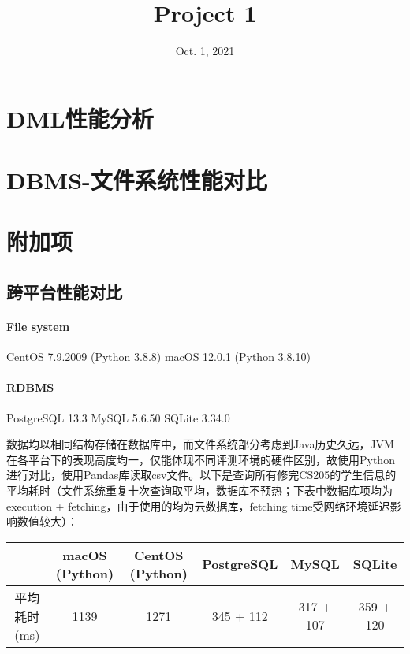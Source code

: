 \documentclass[onecolumn, oneside, ctexart]{SUSTechHomework}
\title{Project 1}
\date{Oct. 1, 2021}
\begin{document}
  \maketitle
  \tableofcontents
  \pagebreak
  \setcounter{page}{1}



\section{DML性能分析}





\section{DBMS-文件系统性能对比}



\section{附加项}





\subsection{跨平台性能对比}
\paragraph{File system}  CentOS 7.9.2009 (Python 3.8.8)\qquad{} macOS 12.0.1 (Python 3.8.10)
\vspace{-1.4em}
\paragraph{RDBMS} \quad\hspace{.276em} PostgreSQL 13.3\qquad{} MySQL 5.6.50\qquad{} SQLite 3.34.0
\par 数据均以相同结构存储在数据库中，而文件系统部分考虑到Java历史久远，JVM在各平台下的表现高度均一，仅能体现不同评测环境的硬件区别，故使用Python进行对比，使用Pandas库读取csv文件。以下是查询所有修完CS205的学生信息的平均耗时（文件系统重复十次查询取平均，数据库不预热；下表中数据库项均为execution + fetching，由于使用的均为云数据库，fetching time受网络环境延迟影响数值较大）：
\begin{table}[!h]
\centering
\begin{tabular}{|c|c|c|c|c|c|}
\hline
          & macOS (Python) & CentOS (Python) & PostgreSQL & MySQL  & SQLite \\ \hline
平均耗时 (ms) & 1139           & 1271            & 345 + 112     & 317 + 107 & 359 + 120 \\ \hline
\end{tabular}
\end{table}
\end{document}
